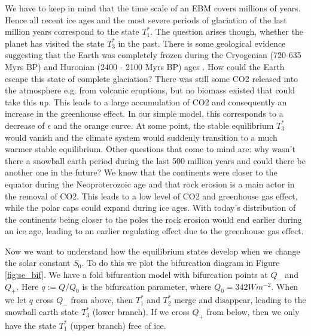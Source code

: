 \documentclass[%
thesis=student,%
coverpage=false,%
titlepage=false,%
headmarks=true, %
english,%
font=libertine, %
math=newpxtx, %
BCOR=5mm,%
coverBCOR=11mm%
]{tumbook}
\begin{document}
We have to keep in mind that the time scale of an EBM covers millions of years. Hence all recent ice ages and the most severe periods of glaciation of the last million years correspond to the state $T_{1}^*$. The question arises though, whether the planet has visited the state $T_{3}^*$ in the past. There is some geological evidence suggesting that the Earth was completely frozen during the Cryogenian (720-635 Myrs BP) and Huronian (2400 - 2100 Myrs BP) ages \cite{Bathiany:2024}. How could the Earth escape this state of complete glaciation? There was still some CO2 released into the atmosphere e.g. from volcanic eruptions, but no biomass existed that could take this up. This leads to a large accumulation of CO2 and consequently an increase in the greenhouse effect. In our simple model, this corresponds to a decrease of $\epsilon$ and the orange curve. At some point, the stable equilibrium $T_{3}^*$ would vanish and the climate system would suddenly transition to a much warmer stable equilibrium. Other questions that come to mind are: why wasn't there a snowball earth period during the last 500 million years and could there be another one in the future? We know that the continents were closer to the equator during the Neoproterozoic age and that rock erosion is a main actor in the removal of CO2. This leads to a low level of CO2 and greenhouse gas effect, while the polar caps could expand during ice ages. With today's distribution of the continents being closer to the poles the rock erosion would end earlier during an ice age, leading to an earlier regulating effect due to the greenhouse gas effect. 

Now we want to understand how the equilibrium states develop when we change the solar constant $S_{0}$. To do this we plot the bifurcation diagram in Figure \ref{fig:se_bif}. We have a fold bifurcation model with bifurcation points at $Q_{-}$ and $Q_{+}$. Here $q := Q/Q_{0}$ is the bifurcation parameter, where $Q_{0} = 342 Wm^{-2}$. When we let $q$ cross $Q_{-}$ from above, then $T_{1}^*$ and $T_{2}^*$ merge and disappear, leading to the snowball earth state $T_{3}^*$ (lower branch). If we cross $Q_{+}$ from below, then we only have the state $T_{1}^*$ (upper branch) free of ice. 
\end{document}
